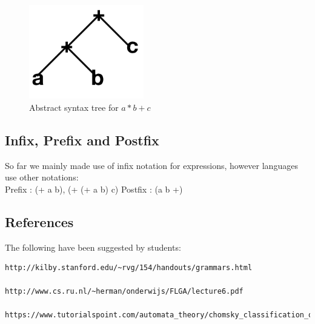 \documentclass{article}
\begin{document}
\begin{figure}
  \centering
   \includegraphics[width=5cm]{abs_tree.png}
\caption{Abstract syntax tree for $a*b+c$ }
  \label{ast}
\end{figure}


\subsection*{Infix, Prefix and Postfix}
So far we mainly made use of infix notation for expressions, however languages use
other notations:\\
{\color{red} Prefix} : (+ a b), (+ (+ a b) c) 
\newline
{\color{red} Postfix} : (a b +)

\subsection*{References}
 
The following have been suggested by students:

\begin{verbatim}
http://kilby.stanford.edu/~rvg/154/handouts/grammars.html
 
http://www.cs.ru.nl/~herman/onderwijs/FLGA/lecture6.pdf
 
https://www.tutorialspoint.com/automata_theory/chomsky_classification_of_grammars.htm
\end{verbatim}
\end{document}

